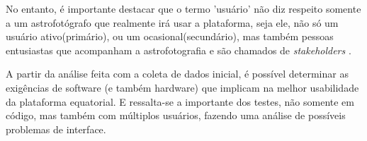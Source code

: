 No entanto, é importante destacar que o termo 'usuário' não diz respeito somente a um astrofotógrafo que realmente irá usar a plataforma, seja ele, não só um usuário ativo(primário), ou um ocasional(secundário), mas também pessoas entusiastas que acompanham a astrofotografia e são chamados de \textit{stakeholders} \cite{BarbosaEtAl2021InteracaoHumanoComputadorExperiencia}.

A partir da análise feita com a coleta de dados inicial, é possível determinar as exigências de software (e também hardware) que implicam na melhor usabilidade da plataforma equatorial. E ressalta-se a importante dos testes, não somente em código, mas também com múltiplos usuários, fazendo uma análise de possíveis problemas de interface.